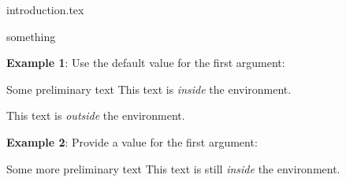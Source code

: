 \documentclass[12pt]{report}
\newenvironment{subroutine_desc}[1]["Enter Name here"]
    {
    \textbf{Subroutine} #1
    
    }
    { 
    
    }
\begin{document}
    
    {introduction.tex}
    \begin{subroutine_desc}
        something
    \end{subroutine_desc}


    

    \textbf{Example 1}: Use the default value for the first argument:
 
    \begin{boxed_v2}{Some preliminary text}
    This text is \textit{inside} the environment.
    \end{boxed_v2}
    
    This text is \textit{outside} the environment.
    
    \vskip12pt
    
    \textbf{Example 2}: Provide a value for the first argument:
     
    \begin{boxed_v2}{Some more preliminary text}
    This text is still \textit{inside} the environment.
    \end{boxed_v2}
\end{document}
